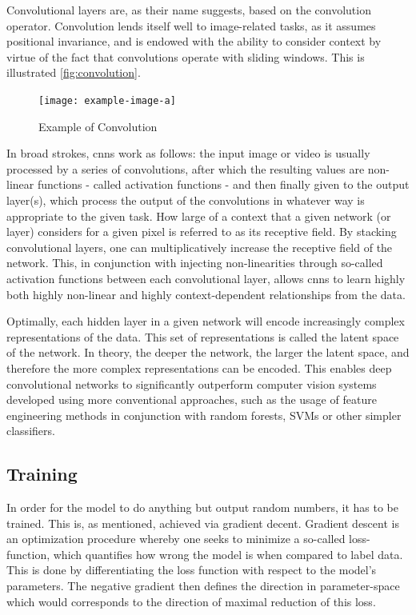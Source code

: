         Convolutional layers are, as their name suggests, based on the convolution operator. Convolution lends itself well to image-related tasks, as it assumes positional invariance, and is endowed with the ability to consider context by virtue of the fact that convolutions operate with sliding windows. This is illustrated \autoref{fig:convolution}.
        \begin{figure}
            \centering
            \texttt{[image: example-image-a]}
            \caption{Example of Convolution}
            \label{fig:convolution}
        \end{figure}
        
        In broad strokes, \glspl{cnn} work as follows: the input image or video is usually processed by a series of convolutions, after which the resulting values are non-linear functions - called activation functions - and then finally given to the output layer(s), which process the output of the convolutions in whatever way is appropriate to the given task. 
        How large of a context that a given network (or layer) considers for a given pixel is referred to as its receptive field. By stacking convolutional layers, one can multiplicatively increase the receptive field of the network. This, in conjunction with injecting non-linearities through so-called activation functions between each convolutional layer, allows \glspl{cnn} to learn highly both highly non-linear and highly context-dependent relationships from the data. 
        
        Optimally, each hidden layer in a given network will encode increasingly complex representations of the data. This set of representations is called the latent space of the network. In theory, the deeper the network, the larger the latent space, and therefore the more complex representations can be encoded. This enables deep convolutional networks to significantly outperform computer vision systems developed using more conventional approaches, such as the usage of feature engineering methods in conjunction with random forests, SVMs or other simpler classifiers.
        
    \subsection{Training}
        In order for the model to do anything but output random numbers, it has to be trained. This is, as mentioned, achieved via gradient decent. Gradient descent is an optimization procedure whereby one seeks to minimize a so-called loss-function, which quantifies how wrong the model is when compared to label data. This is done by differentiating the loss function with respect to the model's parameters. The negative gradient then defines the direction in parameter-space which would corresponds to the direction of maximal reduction of this loss. 
    

